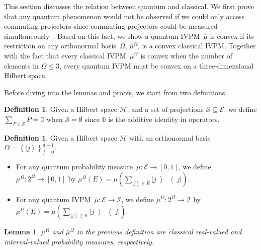 \documentclass[12pt]{iopart}
\theoremstyle{plain}
\newtheorem{lemma}[thm]{Lemma}
\theoremstyle{definition}
\newtheorem{definition}[thm]{Definition}
\newcommand{\Hilb}{\mathcal{H}}
\newcommand{\events}{\ensuremath{\mathcal{E}}}
\newcommand{\ket}[1]{{\left\vert{#1}\right\rangle}}
\newcommand{\op}[2]{\ensuremath{\left\vert{#1}\middle\rangle\middle\langle{#2}\right\vert}}
\newcommand{\proj}[1]{\op{#1}{#1}}
\begin{document}
This section discusses the relation between quantum and classical.
We first prove that any quantum phenomenon would not be observed if
we could only access commuting projectors since commuting projectors
could be measured simultaneously~\cite{Mermin_1993}. Based on this
fact, we show a quantum IVPM~$\bar{\mu}$ is convex if its restriction
on any orthonormal basis~$\Omega$, $\bar{\mu}^{\Omega}$, is a convex
classical IVPM. Together with the fact that every classical IVPM~$\bar{\mu}^{\Omega}$
is convex when the number of elements in $\Omega\le3$, every quantum
IVPM must be convex on a three-dimensional Hilbert space. 

Before diving into the lemmas and proofs, we start from two definitions.

\begin{definition}Given a Hilbert space $\Hilb$, and a set of projections
$\mathcal{S}\subseteq\events$, we define $\sum_{P\in\mathcal{S}}P=\mathbb{0}$
when $\mathcal{S}=\emptyset$ since $\mathbb{0}$ is the additive
identity in operators.\end{definition}

\begin{definition}\label{definition:quantum-classical}Given a Hilbert
space $\Hilb$ with an orthonormal basis~$\Omega=\left\{ \ket{j}\right\} _{j=0}^{d-1}$.
\begin{itemize}
\item For any quantum probability measure~$\mu:\events\rightarrow\left[0,1\right]$,
we define $\mu^{\Omega}:2^{\Omega}\rightarrow\left[0,1\right]$ by
$\mu^{\Omega}\left(E\right)=\mu\left(\sum_{\ket{j}\in E}\proj{j}\right)$.
\item For any quantum IVPM~$\bar{\mu}:\events\rightarrow\mathscr{I}$,
we define $\bar{\mu}^{\Omega}:2^{\Omega}\rightarrow\mathscr{I}$ by
$\bar{\mu}^{\Omega}\left(E\right)=\bar{\mu}\left(\sum_{\ket{j}\in E}\proj{j}\right)$.
\end{itemize}
\end{definition}

\begin{lemma}\label{lemma:classical-probability-measures}$\mu^{\Omega}$
and $\bar{\mu}^{\Omega}$ in the previous definition are classical
real-valued and interval-valued probability measures, respectively.\end{lemma}
\end{document}
